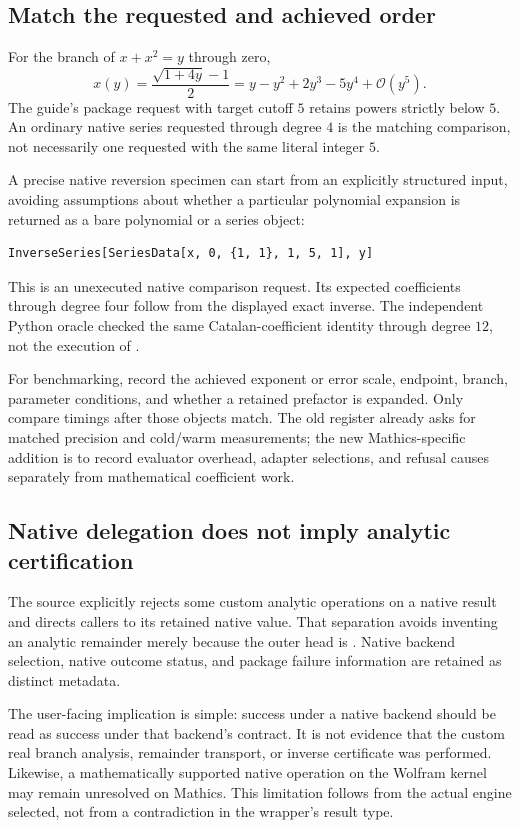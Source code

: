 \documentclass[11pt,a4paper]{article}
\newcommand{\code}[1]{\texttt{\detokenize{#1}}}
\newcommand{\OO}{\mathcal O}
\begin{document}
\subsection{Match the requested and achieved order}

For the branch of $x+x^2=y$ through zero,
\[
 x(y)=\frac{\sqrt{1+4y}-1}{2}
 =y-y^2+2y^3-5y^4+\OO(y^5).
\]
The guide's package request with target cutoff $5$ retains powers strictly below
$5$. An ordinary native series requested through degree $4$ is the matching
comparison, not necessarily one requested with the same literal integer $5$.
\cite{guide,wlseries}

A precise native reversion specimen can start from an explicitly structured
input, avoiding assumptions about whether a particular polynomial expansion is
returned as a bare polynomial or a series object:
\begin{lstlisting}
InverseSeries[SeriesData[x, 0, {1, 1}, 1, 5, 1], y]
\end{lstlisting}
This is an unexecuted native comparison request. Its expected coefficients
through degree four follow from the displayed exact inverse. The independent
Python oracle checked the same Catalan-coefficient identity through degree
$12$, not the execution of \code{InverseSeries}.

For benchmarking, record the achieved exponent or error scale, endpoint,
branch, parameter conditions, and whether a retained prefactor is expanded.
Only compare timings after those objects match. The old register already asks
for matched precision and cold/warm measurements; the new Mathics-specific
addition is to record evaluator overhead, adapter selections, and refusal
causes separately from mathematical coefficient work. \cite{status,mathicsguide}

\subsection{Native delegation does not imply analytic certification}

The source explicitly rejects some custom analytic operations on a native
result and directs callers to its retained native value. That separation avoids
inventing an analytic remainder merely because the outer head is
\code{GeneralizedSeries}. Native backend selection, native outcome status, and
package failure information are retained as distinct metadata. \cite{native}

The user-facing implication is simple: success under a native backend should be
read as success under that backend's contract. It is not evidence that the
custom real branch analysis, remainder transport, or inverse certificate was
performed. Likewise, a mathematically supported native operation on the Wolfram
kernel may remain unresolved on Mathics. This limitation follows from the
actual engine selected, not from a contradiction in the wrapper's result type.
\cite{guide,mathicsguide}
\end{document}
